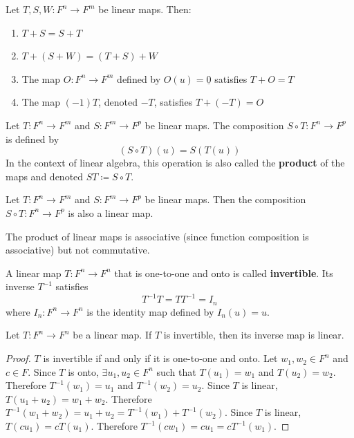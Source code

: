 \begin{theorem}\label{thm:
linear-map-addition-properties} Let $T, S, W: F^n \to F^m$ be linear maps. Then:
\begin{enumerate}[label=(\roman*)] \item $T + S = S + T$ \item $T + (S + W) = (T
+ S) + W$ \item The map $O: F^n \to F^m$ defined by $O(u) = \underline{0}$
satisfies $T + O = T$ \item The map $(-1)T$, denoted $-T$, satisfies $T + (-T) =
O$ \end{enumerate} \end{theorem}

\begin{definition*}\label{def:
composition-linear-maps} Let $T: F^n \to F^m$ and $S: F^m \to F^p$ be linear
maps. The composition $S \circ T: F^n \to F^p$ is defined by \[ (S \circ T)(u) =
S(T(u)) \] In the context of linear algebra, this operation is also called the
\textbf{product} of the maps and denoted $ST \coloneqq S \circ T$.
\end{definition*}

\begin{theorem}\label{thm:composition-is-linear} Let $T: F^n \to F^m$ and $S:
F^m \to F^p$ be linear maps. Then the composition $S \circ T: F^n \to F^p$ is
also a linear map. \end{theorem}

\begin{note} The product of linear maps is associative (since function
composition is associative) but not commutative. \end{note}

\begin{definition*}\label{def:inverse-map} A linear map $T: F^n \to
F^n$ that is one-to-one and onto is called \textbf{invertible}. Its inverse
$T^{-1}$ satisfies \[ T^{-1}T = TT^{-1} = I_n \] where $I_n: F^n \to F^n$ is the
identity map defined by $I_n(u) = u$. \end{definition*}

\begin{theorem}\label{thm:inverse-is-linear} Let $T: F^n \to F^n$ be a linear
map. If $T$ is invertible, then its inverse map is linear. \end{theorem}

\begin{proof} $T$ is invertible if and only if it is one-to-one and onto. Let
$w_1, w_2 \in F^n$ and $c \in F$. Since $T$ is onto, $\exists u_1, u_2 \in F^n$
such that $T(u_1) = w_1$ and $T(u_2) = w_2$. Therefore $T^{-1}(w_1) = u_1$ and
$T^{-1}(w_2) = u_2$. Since $T$ is linear, $T(u_1 + u_2) = w_1 + w_2$. Therefore
$T^{-1}(w_1 + w_2) = u_1 + u_2 = T^{-1}(w_1) + T^{-1}(w_2)$. Since $T$ is linear,
$T(cu_1) = cT(u_1)$. Therefore $T^{-1}(cw_1) = cu_1 = cT^{-1}(w_1)$.
\end{proof}

